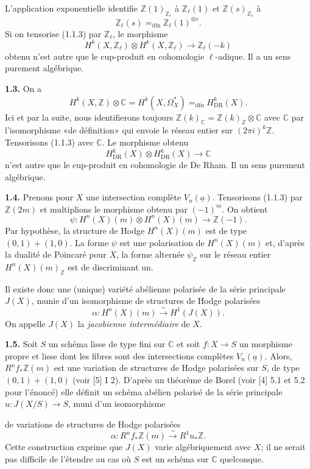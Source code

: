 \documentclass[10pt]{article}
\newcommand{\C}{\mathbb C}
\newcommand{\Z}{\mathbb Z}
\newcommand{\DR}{\mathrm{DR}}
\newcommand{\iso}{\xrightarrow{\sim}}
\newcommand{\dfneq}{\mathrel{=_{\mathrm{dfn}}}}
\newcommand{\sourcebreak}{\clearpage}
\begin{document}
\sourcebreak
L'application exponentielle identifie \(\Z(1)_{\Z_\ell}\) à \(\Z_\ell(1)\) et \(\Z(s)_{\Z_\ell}\) à
\[
\Z_\ell(s)\dfneq\Z_\ell(1)^{\otimes s}.
\]
Si on tensorise (1.1.3) par \(\Z_\ell\), le morphisme
\[
\tag{1.2.1}
H^k(X,\Z_\ell)\otimes H^k(X,\Z_\ell)\longrightarrow\Z_\ell(-k)
\]
obtenu n'est autre que le cup-produit en cohomologie \(\ell\)-adique. Il a un sens purement algébrique.

\noindent\textbf{1.3.} On a
\[
\tag{1.3.1}
H^k(X,\Z)\otimes\C=H^k(X,\Omega_X^*)\dfneq H^k_{\DR}(X).
\]
Ici et par la suite, nous identifierons toujours \(\Z(k)_\C=\Z(k)_\Z\otimes\C\) avec \(\C\) par l'isomorphisme «de définition» qui envoie le réseau entier sur \((2\pi i)^k\Z\). Tensorisons (1.1.3) avec \(\C\). Le morphisme obtenu
\[
\tag{1.3.2}
H^k_{\DR}(X)\otimes H^k_{\DR}(X)\longrightarrow\C
\]
n'est autre que le cup-produit en cohomologie de De Rham. Il un sens purement algébrique.

\noindent\textbf{1.4.} Prenons pour \(X\) une intersection complète \(V_n(\underline a)\). Tensorisons (1.1.3) par \(\Z(2m)\) et multiplions le morphisme obtenu par \((-1)^m\). On obtient
\[
\tag{1.4.1}
\psi:H^n(X)(m)\otimes H^n(X)(m)\longrightarrow\Z(-1).
\]
Par hypothèse, la structure de Hodge \(H^n(X)(m)\) est de type \((0,1)+(1,0)\). La forme \(\psi\) est une polarisation de \(H^n(X)(m)\) et, d'après la dualité de Poincaré pour \(X\), la forme alternée \(\psi_\Z\) sur le réseau entier \(H^n(X)(m)_\Z\) est de discriminant un.

Il existe donc une (unique) variété abélienne polarisée de la série principale \(J(X)\), munie d'un isomorphisme de structures de Hodge polarisées
\[
\alpha:H^n(X)(m)\iso H^1(J(X)).
\]
On appelle \(J(X)\) la \emph{jacobienne intermédiaire} de \(X\).

\noindent\textbf{1.5.} Soit \(S\) un schéma lisse de type fini sur \(\C\) et soit \(f:X\to S\) un morphisme propre et lisse dont les fibres sont des intersections complètes \(V_n(\underline a)\). Alors, \(R^nf_*\Z(m)\) est une variation de structures de Hodge polarisées sur \(S\), de type \((0,1)+(1,0)\) (voir [5] I 2). D'après un théorème de Borel (voir [4] 5.1 et 5.2 pour l'énoncé) elle définit un schéma abélien polarisé de la série principale \(u:J(X/S)\to S\), muni d'un isomorphisme

\sourcebreak
de variations de structures de Hodge polarisées
\[
\alpha:R^nf_*\Z(m)\iso R^1u_*\Z.
\]
Cette construction exprime que \(J(X)\) varie algébriquement avec \(X\); il ne serait pas difficile de l'étendre au cas où \(S\) est un schéma sur \(\C\) quelconque.
\end{document}
